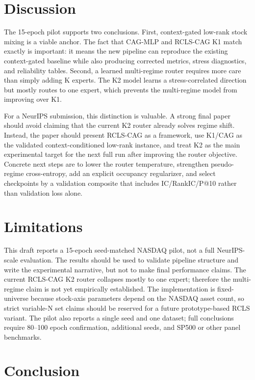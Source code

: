 \documentclass{article}
\begin{document}
\section{Discussion}

The 15-epoch pilot supports two conclusions. First, context-gated low-rank stock mixing is a viable anchor. The fact that CAG-MLP and RCLS-CAG K1 match exactly is important: it means the new pipeline can reproduce the existing context-gated baseline while also producing corrected metrics, stress diagnostics, and reliability tables. Second, a learned multi-regime router requires more care than simply adding K experts. The K2 model learns a stress-correlated direction but mostly routes to one expert, which prevents the multi-regime model from improving over K1.

For a NeurIPS submission, this distinction is valuable. A strong final paper should avoid claiming that the current K2 router already solves regime shift. Instead, the paper should present RCLS-CAG as a framework, use K1/CAG as the validated context-conditioned low-rank instance, and treat K2 as the main experimental target for the next full run after improving the router objective. Concrete next steps are to lower the router temperature, strengthen pseudo-regime cross-entropy, add an explicit occupancy regularizer, and select checkpoints by a validation composite that includes IC/RankIC/P@10 rather than validation loss alone.

\section{Limitations}

This draft reports a 15-epoch seed-matched NASDAQ pilot, not a full NeurIPS-scale evaluation. The results should be used to validate pipeline structure and write the experimental narrative, but not to make final performance claims. The current RCLS-CAG K2 router collapses mostly to one expert; therefore the multi-regime claim is not yet empirically established. The implementation is fixed-universe because stock-axis parameters depend on the NASDAQ asset count, so strict variable-N set claims should be reserved for a future prototype-based RCLS variant. The pilot also reports a single seed and one dataset; full conclusions require 80--100 epoch confirmation, additional seeds, and SP500 or other panel benchmarks.

\section{Conclusion}
\end{document}
